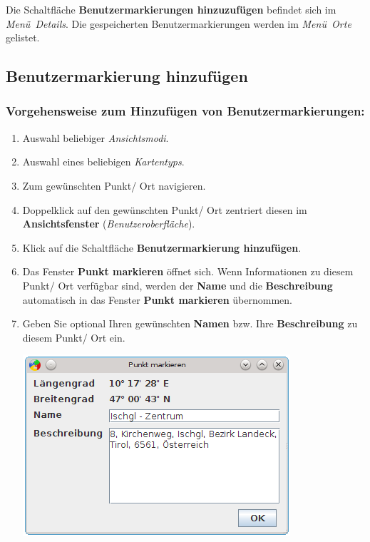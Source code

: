 \documentclass[10pt]{scrreprt}
\newcommand{\textref}[1]{\mbox{\raisebox{0.1ex}{\small$\rightarrow$ }\textit{#1}}}
\begin{document}
Die Schaltfläche \textbf{Benutzermarkierungen hinzuzufügen} befindet sich im \textref{Menü Details}. Die gespeicherten Benutzermarkierungen werden im \textref{Menü Orte} gelistet.


\vspace{3mm}
\subsection{Benutzermarkierung hinzufügen} 


\subsubsection*{Vorgehensweise zum Hinzufügen von Benutzermarkierungen:}
\begin{enumerate}
\item Auswahl beliebiger \textref{Ansichtsmodi}.
\item Auswahl eines beliebigen \textref{Kartentyps}.
\item Zum gewünschten Punkt/ Ort navigieren.
\item Doppelklick auf den gewünschten Punkt/ Ort zentriert diesen im \textbf{Ansichtsfenster} (\textref{Benutzeroberfläche}).
\item Klick auf die Schaltfläche \textbf{Benutzermarkierung hinzufügen}.
\item Das Fenster \textbf{Punkt markieren} öffnet sich. Wenn Informationen zu diesem Punkt/ Ort verfügbar sind, werden der \textbf{Name} und die \textbf{Beschreibung} automatisch in das Fenster \textbf{Punkt markieren} übernommen.
\item Geben Sie optional Ihren gewünschten \textbf{Namen} bzw. Ihre \textbf{Beschreibung} zu diesem Punkt/ Ort ein.
	\vspace{2mm}
	\begin{center}
	\includegraphics[scale=0.4]{images/Benutzermarkierungs_Dialog2.png}

\end{center}
\end{enumerate}
\end{document}
